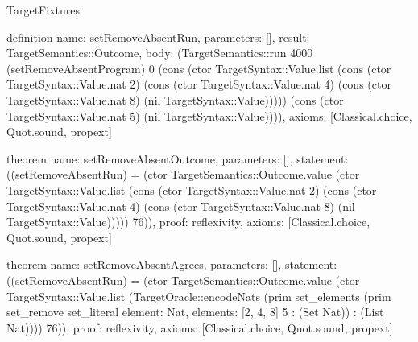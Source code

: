 \begin{lexlean}{TargetFixtures}
\begin{semanticmodule}
definition{
  name: setRemoveAbsentRun,
  parameters: [],
  result: TargetSemantics::Outcome,
  body: (TargetSemantics::run 4000 (setRemoveAbsentProgram) 0 (cons (ctor TargetSyntax::Value.list (cons (ctor TargetSyntax::Value.nat 2) (cons (ctor TargetSyntax::Value.nat 4) (cons (ctor TargetSyntax::Value.nat 8) (nil TargetSyntax::Value))))) (cons (ctor TargetSyntax::Value.nat 5) (nil TargetSyntax::Value)))),
  axioms: [Classical.choice, Quot.sound, propext]
}

theorem{
  name: setRemoveAbsentOutcome,
  parameters: [],
  statement: ((setRemoveAbsentRun) = (ctor TargetSemantics::Outcome.value (ctor TargetSyntax::Value.list (cons (ctor TargetSyntax::Value.nat 2) (cons (ctor TargetSyntax::Value.nat 4) (cons (ctor TargetSyntax::Value.nat 8) (nil TargetSyntax::Value))))) 76)),
  proof: reflexivity{},
  axioms: [Classical.choice, Quot.sound, propext]
}

theorem{
  name: setRemoveAbsentAgrees,
  parameters: [],
  statement: ((setRemoveAbsentRun) = (ctor TargetSemantics::Outcome.value (ctor TargetSyntax::Value.list (TargetOracle::encodeNats (prim set_elements (prim set_remove set_literal{
    element: Nat,
    elements: [2, 4, 8]
  } 5 : (Set Nat)) : (List Nat)))) 76)),
  proof: reflexivity{},
  axioms: [Classical.choice, Quot.sound, propext]
}


\end{semanticmodule}
\end{lexlean}
